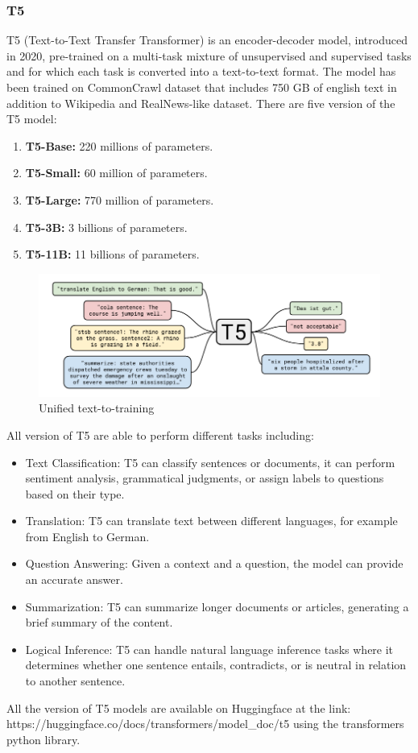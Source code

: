\subsubsection{T5}
T5 (Text-to-Text Transfer Transformer) is an encoder-decoder model, introduced in 2020, pre-trained on a multi-task mixture of unsupervised and supervised tasks\cite{raffel2020exploring} and for which each task is converted into a text-to-text format. The model has been trained on CommonCrawl dataset that includes 750 GB of english text in addition to Wikipedia and RealNews-like dataset.
There are five version of the T5 model:
\begin{enumerate}
    \item \textbf{T5-Base:} 220 millions of parameters.
    \item \textbf{T5-Small:} 60 million of parameters.
    \item \textbf{T5-Large:} 770 million of parameters.
    \item \textbf{T5-3B:} 3 billions of parameters.
    \item \textbf{T5-11B:} 11 billions of parameters.
\end{enumerate}
\begin{figure}[H]
    \centering
    \includegraphics[width=0.8\linewidth]{Figures/fig_19.png}
    \caption{Unified text-to-training}
    \label{fig:enter-label}
\end{figure}
All version of T5 are able to perform different tasks including:\cite{t5_docs}
\begin{itemize}
    \item Text Classification: T5 can classify sentences or documents, it can perform sentiment analysis, grammatical judgments, or assign labels to questions based on their type.

    \item Translation: T5 can translate text between different languages, for example from English to German.

    \item Question Answering: Given a context and a question, the model can provide an accurate answer.

    \item Summarization: T5 can summarize longer documents or articles, generating a brief summary of the content.

    \item Logical Inference: T5 can handle natural language inference tasks where it determines whether one sentence entails, contradicts, or is neutral in relation to another sentence.
\end{itemize}
All the version of T5 models are available on Huggingface at the link:\\
https://huggingface.co/docs/transformers/model\_doc/t5
using the transformers python library.

